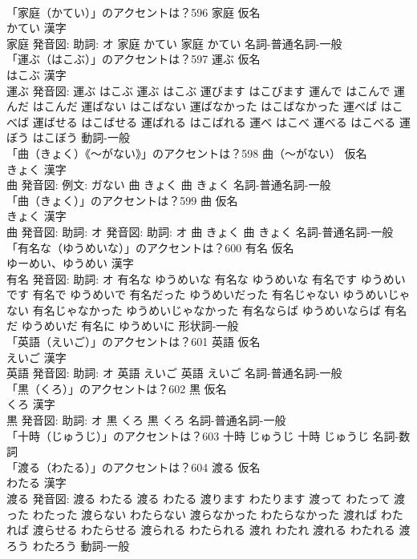 \documentclass[8pt]{extreport}
\begin{document}
\begin{CJK}{UTF8}{min}
\\	「家庭（かてい）」のアクセントは？596	家庭 仮名　
\\	かてい 漢字　
\\	家庭 発音図: 助詞: オ	家庭 かてい		家庭 かてい				名詞-普通名詞-一般 
\\	「運ぶ（はこぶ）」のアクセントは？597	運ぶ 仮名　
\\	はこぶ 漢字　
\\	運ぶ 発音図:	運ぶ はこぶ		運ぶ はこぶ 運びます はこびます 運んで はこんで 運んだ はこんだ 運ばない はこばない 運ばなかった はこばなかった 運べば はこべば 運ばせる はこばせる 運ばれる はこばれる 運べ はこべ 運べる はこべる 運ぼう はこぼう				動詞-一般 
\\	「曲（きょく）《〜がない》」のアクセントは？598	曲（〜がない） 仮名　
\\	きょく 漢字　
\\	曲 発音図: 例文: ガない	曲 きょく		曲 きょく				名詞-普通名詞-一般 
\\	「曲（きょく）」のアクセントは？599	曲 仮名　
\\	きょく 漢字　
\\	曲 発音図: 助詞: オ 発音図: 助詞: オ	曲 きょく		曲 きょく				名詞-普通名詞-一般 
\\	「有名な（ゆうめいな）」のアクセントは？600	有名 仮名　
\\	ゆーめい、ゆうめい 漢字　
\\	有名 発音図: 助詞: オ	有名な ゆうめいな		有名な ゆうめいな 有名です ゆうめいです 有名で ゆうめいで 有名だった ゆうめいだった 有名じゃない ゆうめいじゃない 有名じゃなかった ゆうめいじゃなかった 有名ならば ゆうめいならば 有名だ ゆうめいだ 有名に ゆうめいに				形状詞-一般 
\\	「英語（えいご）」のアクセントは？601	英語 仮名　
\\	えいご 漢字　
\\	英語 発音図: 助詞: オ	英語 えいご		英語 えいご				名詞-普通名詞-一般 
\\	「黒（くろ）」のアクセントは？602	黒 仮名　
\\	くろ 漢字　
\\	黒 発音図: 助詞: オ	黒 くろ		黒 くろ				名詞-普通名詞-一般 
\\	「十時（じゅうじ）」のアクセントは？603		十時 じゅうじ		十時 じゅうじ				名詞-数詞 
\\	「渡る（わたる）」のアクセントは？604	渡る 仮名　
\\	わたる 漢字　
\\	渡る 発音図:	渡る わたる		渡る わたる 渡ります わたります 渡って わたって 渡った わたった 渡らない わたらない 渡らなかった わたらなかった 渡れば わたれば 渡らせる わたらせる 渡られる わたられる 渡れ わたれ 渡れる わたれる 渡ろう わたろう				動詞-一般 

\end{CJK}
\end{document}
